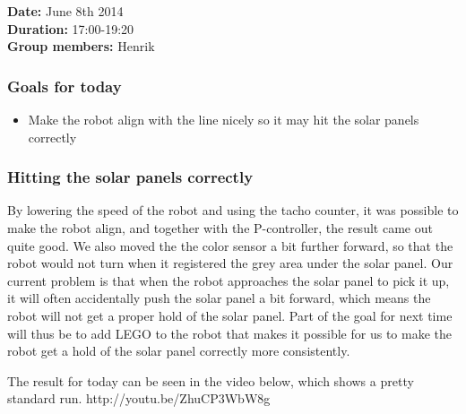 \textbf{Date:} June 8th 2014\\\textbf{Duration:}
17:00-19:20\\\textbf{Group members:} Henrik

\subsubsection{Goals for today}

\begin{itemize}
\itemsep1pt\parskip0pt
\item
  Make the robot align with the line nicely so it may hit the solar
  panels correctly
\end{itemize}

\subsubsection{Hitting the solar panels correctly}

By lowering the speed of the robot and using the tacho counter, it was
possible to make the robot align, and together with the P-controller,
the result came out quite good. We also moved the the color sensor a bit
further forward, so that the robot would not turn when it registered the
grey area under the solar panel. Our current problem is that when the
robot approaches the solar panel to pick it up, it will often
accidentally push the solar panel a bit forward, which means the robot
will not get a proper hold of the solar panel. Part of the goal for next
time will thus be to add LEGO to the robot that makes it possible for us
to make the robot get a hold of the solar panel correctly more
consistently.

The result for today can be seen in the video below, which shows a
pretty standard run. http://youtu.be/ZhuCP3WbW8g
